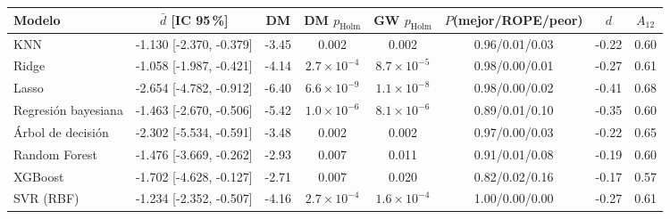 \begin{tabular}{lccccccc}
\toprule
Modelo & $\bar d$ [IC 95\,\%] & DM & DM $p_{\mathrm{Holm}}$ & GW $p_{\mathrm{Holm}}$ & $P$(mejor/ROPE/peor) & $d$ & $A_{12}$ \\
\midrule
KNN & -1.130 [-2.370, -0.379] & -3.45 & 0.002 & 0.002 & 0.96/0.01/0.03 & -0.22 & 0.60 \\
Ridge & -1.058 [-1.987, -0.421] & -4.14 & $2.7\times10^{-4}$ & $8.7\times10^{-5}$ & 0.98/0.00/0.01 & -0.27 & 0.61 \\
Lasso & -2.654 [-4.782, -0.912] & -6.40 & $6.6\times10^{-9}$ & $1.1\times10^{-8}$ & 0.98/0.00/0.02 & -0.41 & 0.68 \\
Regresión bayesiana & -1.463 [-2.670, -0.506] & -5.42 & $1.0\times10^{-6}$ & $8.1\times10^{-6}$ & 0.89/0.01/0.10 & -0.35 & 0.60 \\
Árbol de decisión & -2.302 [-5.534, -0.591] & -3.48 & 0.002 & 0.002 & 0.97/0.00/0.03 & -0.22 & 0.65 \\
Random Forest & -1.476 [-3.669, -0.262] & -2.93 & 0.007 & 0.011 & 0.91/0.01/0.08 & -0.19 & 0.60 \\
XGBoost & -1.702 [-4.628, -0.127] & -2.71 & 0.007 & 0.020 & 0.82/0.02/0.16 & -0.17 & 0.57 \\
SVR (RBF) & -1.234 [-2.352, -0.507] & -4.16 & $2.7\times10^{-4}$ & $1.6\times10^{-4}$ & 1.00/0.00/0.00 & -0.27 & 0.61 \\
\bottomrule
\end{tabular}